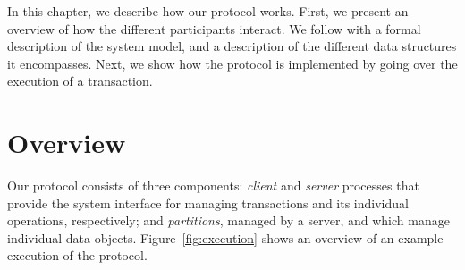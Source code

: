 \newcommand{\parti}{\mathit{p_i}}
\newcommand{\partj}{\mathit{s_j}}

\newcommand{\transtype}{{\sf Tx}}
\newcommand{\keytype}{{\sf Object}}
\newcommand{\valuetype}{{\sf Value}}
\newcommand{\vctype}{{\sf VerVector}}

\newcommand{\val}{{\sf val}}

\newcommand{\tx}{\ensuremath{\mathit{T}}}

\newcommand{\commitVC}{\mathit{Vcomm}}

\newcommand{\localkey}{{\sf k}}
\newcommand{\localval}{{\sf v}}
\newcommand{\partitionof}{{\sf partition}}

\newcommand{\SubAlgo}[2]{#1 \SubAlgoBlock{#2}}



In this chapter, we describe how our protocol  works. First, we present an overview of how the different participants interact. We follow with a formal description of the system model, and a description of the different data structures it encompasses. Next, we show how the protocol is implemented by going over the execution of a transaction.

\section{Overview}

Our protocol consists of three components: \emph{client} and \emph{server} processes that provide the system interface for managing transactions and its individual operations, respectively; and \emph{partitions}, managed by a server, and which manage individual data objects. Figure~\ref{fig:execution} shows an overview of an example execution of the protocol.

